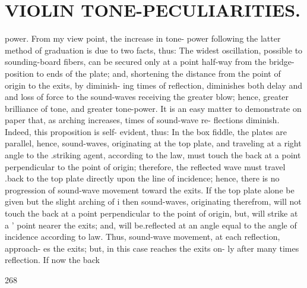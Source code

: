 \documentclass{article}
\begin{document}
\section*{VIOLIN TONE-PECULIARITIES.}
power. From my view point, the increase in tone- power following the latter method of graduation is due to two facts, thus: The widest oscillation, possible to sounding-board fibers, can be secured only at a point half-way from the bridge-position to ends of the plate; and, shortening the distance from the point of origin to the exits, by diminish- ing times of reflection, diminishes both delay and and loss of force to the sound-waves receiving the greater blow; hence, greater brilliance of tone, and greater tone-power. It is an easy matter to demonstrate on paper that, as arching increases, times of sound-wave re- flections diminish. Indeed, this proposition is self- evident, thus: In the box fiddle, the plates are parallel, hence, sound-waves, originating at the top plate, and traveling at a right angle to the .striking agent, according to the law, must touch the back at a point perpendicular to the point of origin; therefore, the reflected wave must travel .back to the top plate directly upon the line of incidence; hence, there is no progression of sound-wave movement toward the exits. If the top plate alone be given but the slight arching of i then sound-waves, originating therefrom, will not touch the back at a point perpendicular to the point of origin, but, will strike at a ' point nearer the exits; and, will be.reflected at an angle equal to the angle of incidence according to law. Thus, sound-wave movement, at each reflection, approach- es the exits; but, in this case reaches the exits on- ly after many times reflection. If now the back

268
\end{document}
